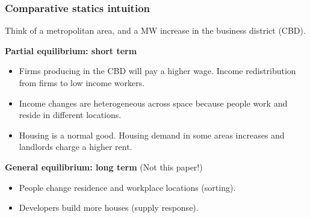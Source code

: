 \documentclass[aspectratio=169, t]{beamer}
\begin{document}
\begin{frame}
	\frametitle{Comparative statics intuition}
    
    \vspace{3mm}
    
	Think of a metropolitan area, and a MW increase in the business district (CBD). 
	
	\vspace{3mm}
	
    \textbf{Partial equilibrium: short term}
	\begin{itemize}
		\vspace{.5mm} \item Firms producing in the CBD will pay a higher wage. Income redistribution 
		from firms to low income workers.
		\vspace{.5mm} \item Income changes are heterogeneous across space because people work 
		and reside in different locations.
		\vspace{.5mm} \item Housing is a normal good. Housing demand in some areas increases 
		and landlords charge a higher rent.
	\end{itemize}

	\pause
	\vspace{3mm}
	\textbf{General equilibrium: long term} (Not this paper!)
	\begin{itemize}
	\vspace{.5mm} \item People change residence and workplace locations (sorting).
	\vspace{.5mm} \item Developers build more houses (supply response).
\end{itemize}
\end{frame}
\end{document}
